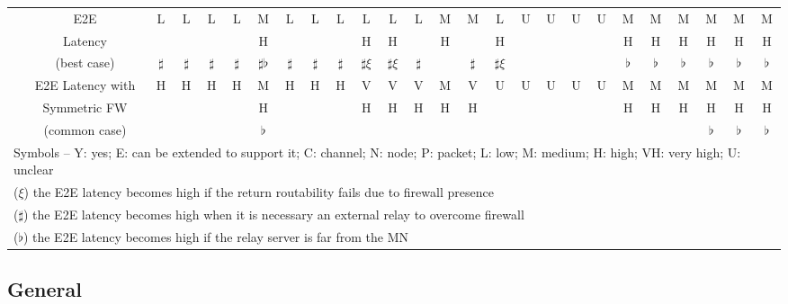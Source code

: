 \documentclass[preprint,12pt]{elsarticle}
\begin{document}
\begin{landscape}
\begin{table*}[t]
\begin{tabular}{|c|c|c|c|c|c|c|c|c|c|c|c|c|c|c|c|c|c|c|c|c|c|c|c|c|c|}
  \hhline{~-------------------------}
    & E2E & \multirow{2}{*}{L}  & \multirow{2}{*}{L} & 
	      \multirow{2}{*}{L} & \multirow{2}{*}{L} & M 
	      & \multirow{2}{*}{L} & 
	      \multirow{2}{*}{L} & \multirow{2}{*}{L} & L & 
	      L  & \multirow{2}{*}{L} & M & \multirow{2}{*}{M} & 
L & \multirow{2}{*}{U} & \multirow{2}{*}{U} & \multirow{2}{*}{U} & 
	      \multirow{2}{*}{U} 
	      & M & M & M & M & M & M\\
    & Latency & &  & & & H & & & & H &  H & & H & & H & & & & & H & H & H & H & H & H\\
    & (best case) &  $\sharp$ & $\sharp$ & $\sharp$ & $\sharp$ & $\sharp\flat$ & $\sharp$ & 
	      $\sharp$ & $\sharp$ &  $\sharp\xi$ & $\sharp\xi$ & 
	      $\sharp$ & & $\sharp$ & $\sharp\xi$ & & & & &
	      $\flat$ & $\flat$ & $\flat$ & $\flat$ & $\flat$ & $\flat$\\
  \hhline{~-------------------------}
    & E2E Latency with & \multirow{3}{*}{H}  & \multirow{3}{*}{H} & 
	      \multirow{3}{*}{H} & \multirow{3}{*}{H} & M 
	      & \multirow{3}{*}{H} & 
	      \multirow{3}{*}{H} & \multirow{3}{*}{H} & V & 
V &  V & M & V &  \multirow{3}{*}{U} & \multirow{3}{*}{U} & \multirow{3}{*}{U} & \multirow{3}{*}{U} & \multirow{3}{*}{U} & M & M & M & M & M & M\\
    & Symmetric FW & & & &  & H & & & & H & H & H & H & H & & & & & & H & H & H & H & H & H\\
    & (common case) &  & &    &  & $\flat$ &  & &  & & & & & & & & & & & & & & $\flat$ & $\flat$ & $\flat$ \\
\hline
\hline
\multicolumn{26}{|l|}{Symbols -- Y: yes; E: can be extended to support it; C: channel; N: node; P: packet; L: low; M: medium; H: high; VH: very high; U: unclear}\\
\multicolumn{26}{|l|}{($\xi$) the E2E latency becomes high if the return routability fails due to firewall presence}\\
\multicolumn{26}{|l|}{($\sharp$) the E2E latency becomes high when it is necessary an external relay to overcome firewall}\\
\multicolumn{26}{|l|}{($\flat$) the E2E latency becomes high if the relay server is far from the MN}\\
\hline
\hline
\end{tabular}
\end{table*}
\restoregeometry
\end{landscape}


\subsection{General}
\end{document}
